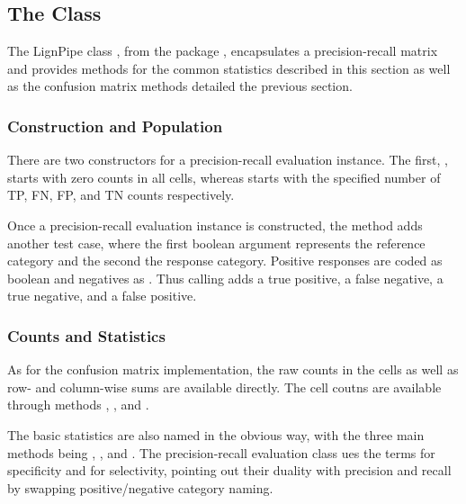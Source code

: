 \subsection{The  Class}

The LignPipe class , from the package
, encapsulates a precision-recall matrix and
provides methods for the common statistics described in this section
as well as the confusion matrix methods detailed the previous section.  

\subsubsection{Construction and Population}

There are two constructors for a precision-recall evaluation instance.
The first, , starts with zero counts
in all cells, whereas
 starts with the
specified number of TP, FN, FP, and TN counts respectively.

Once a precision-recall evaluation instance is constructed, the method
 adds another test case, where the
first boolean argument represents the reference category and the
second the response category.  Positive responses are coded as boolean
 and negatives as .  Thus calling
 adds a true positive,
 a false negative,
 a true negative, and
 a false positive.

\subsubsection{Counts and Statistics}

As for the confusion matrix implementation, the raw counts in the
cells as well as row- and column-wise sums are available directly.
The cell coutns are available through methods ,
,  and
.  

The basic statistics are also named in the obvious way, with the three
main methods being , , and
.  The precision-recall evaluation class ues the
terms  for specificity and
 for selectivity, pointing out their
duality with precision and recall by swapping positive/negative
category naming.  


